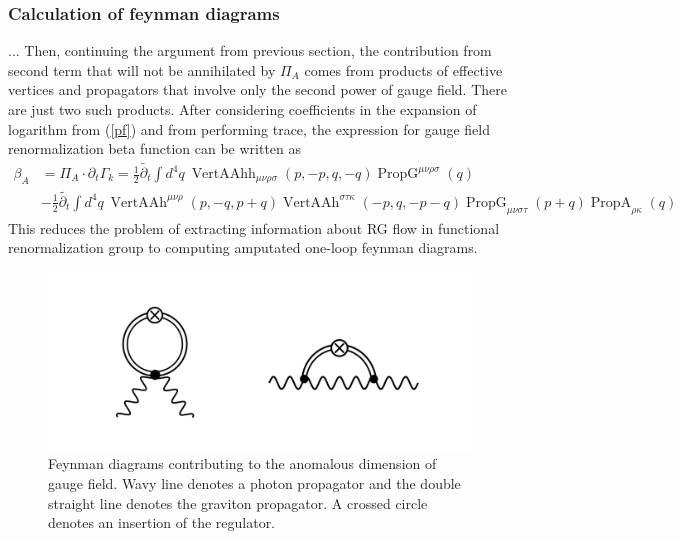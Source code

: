 \documentclass[11pt, a4paper]{article}
\begin{document}
\subsubsection{Calculation of feynman diagrams}
... Then, continuing the argument from previous section, the contribution from second term that will not be annihilated
by $\varPi_A$ comes from products of effective vertices and propagators that involve only the second power of gauge field.
There are just two such products. After considering coefficients in the expansion of logarithm from (\ref{pf}) and from performing trace, the expression for gauge field renormalization beta function can be written as
\begin{align}
    \beta_A & = \varPi_A \cdot \partial_t \Gamma_k = \frac{1}{2} \widetilde{\partial_t} \int d^4 q \ \operatorname{VertAAhh}_{\mu\nu\rho\sigma}(p,-p,q,-q) \operatorname{PropG}^{\mu\nu\rho\sigma}(q)\\
    & - \frac{1}{2} \widetilde{\partial_t} \int d^4 q \ \operatorname{VertAAh}^{\mu\nu\rho}(p,-q,p+q) \operatorname{VertAAh}^{\sigma\tau\kappa}(-p,q,-p-q)  \operatorname{PropG}_{\mu\nu\sigma\tau}(p+q) \operatorname{PropA}_{\rho\kappa}(q)
\end{align}
This reduces the problem of extracting information about RG flow in functional renormalization group to computing amputated one-loop feynman diagrams.
\begin{figure}[H]
    \includegraphics[width=1\textwidth]{./figures/diags.png}
    \caption{Feynman diagrams contributing to the anomalous dimension of gauge field. Wavy line denotes a photon propagator
    and the double straight line denotes the graviton propagator. A crossed circle denotes an insertion of the regulator.}
    \label{diags}
\end{figure} 

\end{document}
